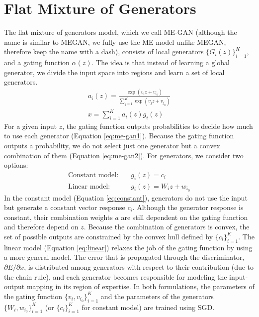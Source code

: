 \documentclass[a4paper,onesided,12pt]{report}
\begin{document}
\section{Flat Mixture of Generators}
\label{sec:me-gan}
The flat mixture of generators model, which we call ME-GAN (although the name is similar to MEGAN, we fully use the ME model unlike MEGAN, therefore keep the name with a dash), consists of local generators $\{G_i(z)\}_{i=1}^{K}$, and a gating function $\alpha(z)$. The idea is that instead of learning a global generator, we divide the input space into regions and learn a set of local generators.
\begin{gather}
a_i(z) = \frac{\exp{(v_i z+v_{i_0})}}{\sum_{j=1}^K \exp{(v_j z+v_{j_0})}} \label{eq:me-gan1}\\
x = \sum_{i=1}^K a_i(z) g_i(z) \label{eq:me-gan2}
\end{gather}
For a given input $z$, the gating function outputs probabilities to decide how much to use each generator (Equation \ref{eq:me-gan1}). Because the gating function outputs a probability, we do not select just one generator but a convex combination of them (Equation \ref{eq:me-gan2}). For generators, we consider two options:
\begin{align}
\text{Constant model:} \quad & g_i(z) = c_i \label{eq:constant}\\
\text{Linear model:} \quad & g_i(z) = W_i z + w_{i_0} \label{eq:linear}
\end{align}
In the constant model (Equation \ref{eq:constant}), generators do not use the input but generate a constant vector response $c_i$. Although the generator response is constant, their combination weights $a$ are still dependent on the gating function and therefore depend on $z$. Because the combination of generators is convex, the set of possible outputs are constrained by the convex hull defined by $\{c_i\}_{i=1}^K$. The linear model (Equation \ref{eq:linear}) relaxes the job of the gating function by using a more general model. The error that is propagated through the discriminator, $\partial E / \partial x$, is distributed among generators with respect to their contribution (due to the chain rule), and each generator becomes responsible for modeling the input-output mapping in its region of expertise. In both formulations, the parameters of the gating function $\{v_i, v_{i_0}\}_{i=1}^K$ and the parameters of the generators $\{W_i, w_{i_0} \}_{i=1}^K$ (or $\{ c_i \}_{i=1}^K$ for constant model) are trained using SGD.
\end{document}
